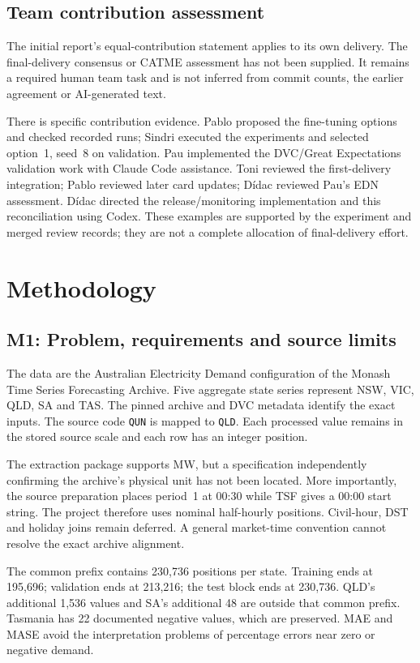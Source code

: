 \documentclass[a4paper,11pt]{article}
\begin{document}
\subsection{Team contribution assessment}

The initial report's equal-contribution statement applies to its own delivery.
The final-delivery consensus or CATME assessment has not been supplied. It remains
a required human team task and is not inferred from commit counts, the earlier
agreement or AI-generated text.

There is specific contribution evidence. Pablo proposed the fine-tuning options
and checked recorded runs; Sindri executed the experiments and selected option~1,
seed~8 on validation. Pau implemented the DVC/Great Expectations validation work
with Claude Code assistance. Toni reviewed the first-delivery integration;
Pablo reviewed later card updates; Dídac reviewed Pau's EDN assessment. Dídac
directed the release/monitoring implementation and this reconciliation using
Codex. These examples are supported by the experiment and merged review records;
they are not a complete allocation of final-delivery effort.

\section{Methodology}
\subsection{M1: Problem, requirements and source limits}

The data are the Australian Electricity Demand configuration of the Monash Time
Series Forecasting Archive. Five aggregate state series represent NSW, VIC, QLD,
SA and TAS. The pinned archive and DVC metadata identify the exact inputs. The
source code \texttt{QUN} is mapped to \texttt{QLD}. Each processed value remains
in the stored source scale and each row has an integer position.

The extraction package supports MW, but a specification independently confirming
the archive's physical unit has not been located. More importantly, the source
preparation places period~1 at 00:30 while TSF gives a 00:00 start string. The
project therefore uses nominal half-hourly positions. Civil-hour, DST and holiday
joins remain deferred. A general market-time convention cannot resolve the exact
archive alignment.

The common prefix contains 230,736 positions per state. Training ends at 195,696;
validation ends at 213,216; the test block ends at 230,736. QLD's additional 1,536
values and SA's additional 48 are outside that common prefix. Tasmania has 22
documented negative values, which are preserved. MAE and MASE avoid the
interpretation problems of percentage errors near zero or negative demand.
\end{document}
